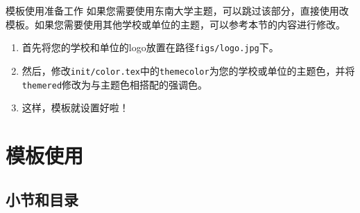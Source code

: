 \documentclass[8pt]{ctexbeamer}
\begin{document}
\begin{frame}{\insertsection}{\insertsubsection}
    \begin{block}{模板使用准备工作}
        如果您需要使用东南大学主题，可以跳过该部分，直接使用改模板。如果您需要使用其他学校或单位的主题，可以参考本节的内容进行修改。
        \begin{enumerate}
            \item 首先将您的学校和单位的logo放置在路径\lstinline|figs/logo.jpg|下。
            \item 然后，修改\lstinline|init/color.tex|中的\lstinline|themecolor|为您的学校或单位的主题色，并将\lstinline|themered|修改为与主题色相搭配的强调色。
            \item 这样，模板就设置好啦！
        \end{enumerate}
    \end{block}
\end{frame}

\section{模板使用}

\makesection

\subsection{小节和目录}
\end{document}
